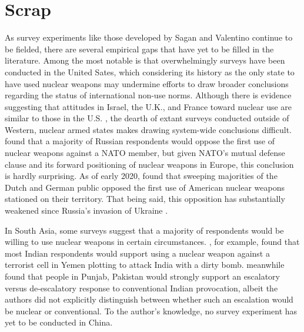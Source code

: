 \documentclass[12pt]{article}
\begin{document}
\section{Scrap}

As survey experiments like those developed by Sagan and Valentino continue to be fielded, there are several empirical gaps that have yet to be filled in the literature. Among the most notable is that overwhelmingly surveys have been conducted in the United Sates, which considering its history as the only state to have used nuclear weapons may undermine efforts to draw broader conclusions regarding the status of international non-use norms. Although there is evidence suggesting that attitudes in Israel, the U.K., and France toward nuclear use are similar to those in the U.S. \citep{dill_kettles_2022}, the dearth of extant surveys conducted outside of Western, nuclear armed states makes drawing system-wide conclusions difficult. \citet{smetana_moscow_2022} found that a majority of Russian respondents would oppose the first use of nuclear weapons against a NATO member, but given NATO's mutual defense clause and its forward positioning of nuclear weapons in Europe, this conclusion is hardly surprising. As of early 2020, \citet{onderco_ideology_2022} found that sweeping majorities of the Dutch and German public opposed the first use of American nuclear weapons stationed on their territory. That being said, this opposition has substantially weakened since Russia's invasion of Ukraine \citep{onderco_hawks_2023}.

In South Asia, some surveys suggest that a majority of respondents would be willing to use nuclear weapons in certain circumstances. \citet{schwartz_when_2024}, for example, found that most Indian respondents would support using a nuclear weapon against a terrorist cell in Yemen plotting to attack India with a dirty bomb. \citet{clary_public_2021} meanwhile found that people in Punjab, Pakistan would strongly support an escalatory versus de-escalatory response to conventional Indian provocation, albeit the authors did not explicitly distinguish between whether such an escalation would be nuclear or conventional. To the author's knowledge, no survey experiment has yet to be conducted in China.
\end{document}
